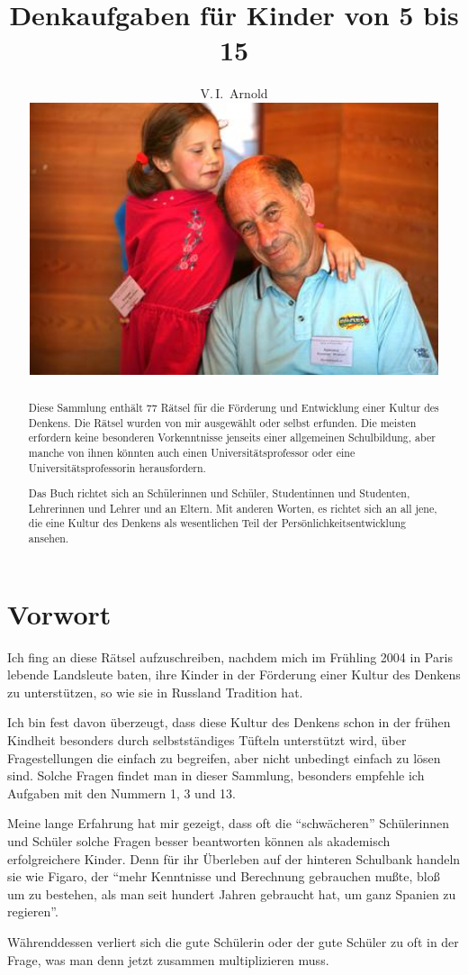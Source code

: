 \documentclass[10pt,a5paper,twoside]{article}
\title{Denkaufgaben für Kinder von 5 bis 15}
\author{V.\,I.~Arnold
\vspace*{2cm}\\ 
\includegraphics[width=12cm]{photo-arnold_small}
}
\date{}
\begin{document}


\def\eps{\varepsilon}


\begin{abstract}
\noindent Diese Sammlung enthält 77 Rätsel für die Förderung und Entwicklung einer Kultur des Denkens. Die Rätsel wurden von mir ausgewählt oder selbst erfunden. Die meisten erfordern keine besonderen Vorkenntnisse jenseits einer allgemeinen Schulbildung, aber manche von ihnen könnten auch einen Universitätsprofessor oder eine Uni\-ver\-si\-täts\-pro\-fes\-sorin herausfordern. 

Das Buch richtet sich an Schülerinnen und Schüler, Studentinnen und Studenten, Lehrerinnen und Lehrer und an Eltern. Mit anderen Worten, es richtet sich an all jene, die eine Kultur des Denkens als wesentlichen Teil der Persönlichkeitsentwicklung ansehen.
\end{abstract}
\clearpage

\section*{Vorwort}

Ich fing an diese Rätsel aufzuschreiben, nachdem mich im Frühling 2004 in Paris lebende Landsleute baten, ihre Kinder in der Förderung einer Kultur des Denkens zu unterstützen, so wie sie in Russland Tradition hat.

Ich bin fest davon überzeugt, dass diese Kultur des Denkens schon in der frühen Kindheit besonders durch selbstständiges Tüfteln unterstützt wird, über Fragestellungen die einfach zu begreifen, aber nicht unbedingt einfach zu lösen sind. Solche Fragen findet man in dieser Sammlung, besonders empfehle ich Aufgaben mit den Nummern 1, 3 und 13.

Meine lange Erfahrung hat mir gezeigt, dass oft die \enquote{schwächeren} Schü\-le\-rin\-nen und Schüler solche Fragen besser beantworten können als akademisch erfolgreichere Kinder. Denn für ihr Überleben auf der hinteren Schulbank handeln sie wie Figaro, der \enquote{mehr Kenntnisse und Berechnung gebrauchen mußte, bloß um zu bestehen, als man seit hundert Jahren gebraucht hat, um ganz Spanien zu regieren}.

Währenddessen verliert sich die gute Schülerin oder der gute Schüler zu oft in der Frage, was man denn jetzt zusammen multiplizieren muss. 
\end{document}
